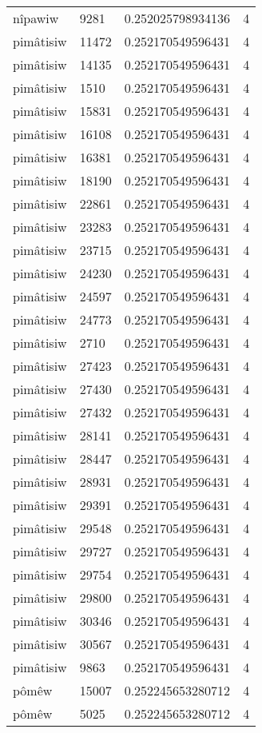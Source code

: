 \begin{longtable}{llll}
nîpawiw & 9281 & 0.252025798934136 & 4 \\
pimâtisiw & 11472 & 0.252170549596431 & 4 \\
pimâtisiw & 14135 & 0.252170549596431 & 4 \\
pimâtisiw & 1510 & 0.252170549596431 & 4 \\
pimâtisiw & 15831 & 0.252170549596431 & 4 \\
pimâtisiw & 16108 & 0.252170549596431 & 4 \\
pimâtisiw & 16381 & 0.252170549596431 & 4 \\
pimâtisiw & 18190 & 0.252170549596431 & 4 \\
pimâtisiw & 22861 & 0.252170549596431 & 4 \\
pimâtisiw & 23283 & 0.252170549596431 & 4 \\
pimâtisiw & 23715 & 0.252170549596431 & 4 \\
pimâtisiw & 24230 & 0.252170549596431 & 4 \\
pimâtisiw & 24597 & 0.252170549596431 & 4 \\
pimâtisiw & 24773 & 0.252170549596431 & 4 \\
pimâtisiw & 2710 & 0.252170549596431 & 4 \\
pimâtisiw & 27423 & 0.252170549596431 & 4 \\
pimâtisiw & 27430 & 0.252170549596431 & 4 \\
pimâtisiw & 27432 & 0.252170549596431 & 4 \\
pimâtisiw & 28141 & 0.252170549596431 & 4 \\
pimâtisiw & 28447 & 0.252170549596431 & 4 \\
pimâtisiw & 28931 & 0.252170549596431 & 4 \\
pimâtisiw & 29391 & 0.252170549596431 & 4 \\
pimâtisiw & 29548 & 0.252170549596431 & 4 \\
pimâtisiw & 29727 & 0.252170549596431 & 4 \\
pimâtisiw & 29754 & 0.252170549596431 & 4 \\
pimâtisiw & 29800 & 0.252170549596431 & 4 \\
pimâtisiw & 30346 & 0.252170549596431 & 4 \\
pimâtisiw & 30567 & 0.252170549596431 & 4 \\
pimâtisiw & 9863 & 0.252170549596431 & 4 \\
pômêw & 15007 & 0.252245653280712 & 4 \\
pômêw & 5025 & 0.252245653280712 & 4 \\

\end{longtable}
